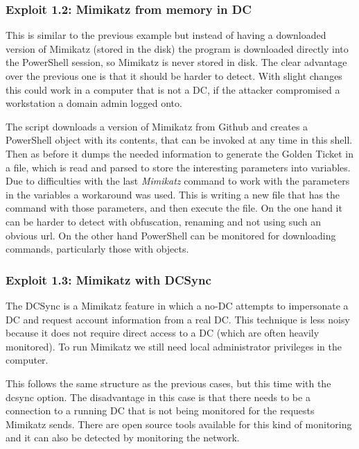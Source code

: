 \subsubsection{Exploit 1.2: Mimikatz from memory in DC} \label{invoke-Mimikatz}
This is similar to the previous example but instead of having a downloaded version of Mimikatz (stored in the disk) the program is downloaded directly into the PowerShell session, so Mimikatz is never stored in disk.
The clear advantage over the previous one is that it should be harder to detect.
\linej
With slight changes this could work in a computer that is not a DC, if the attacker compromised a workstation a domain admin logged onto\cite{dump_ways}.
\linej

\linej
The script downloads a version of Mimikatz from Github and creates a PowerShell object with its contents, that can be invoked at any time in this shell\cite{powersploit}\cite{mimikatz_details}. Then as before it dumps the needed information to generate the Golden Ticket in a file, which is read and parsed to store the interesting parameters into variables.
\linej
Due to difficulties with the last \textit{Mimikatz} command to work with the parameters in the variables a workaround was used. This is writing a new file that has the command with those parameters, and then execute the file.
\linej
\linej
On the one hand it can be harder to detect with obfuscation, renaming and not using such an obvious url.
On the other hand PowerShell can be monitored for downloading commands, particularly those with objects.

\subsubsection{Exploit 1.3: Mimikatz with DCSync}
The DCSync is a Mimikatz feature in which a no-DC attempts to impersonate a DC and request account information from a real DC. This technique is less noisy because it does not require direct access to a DC (which are often heavily monitored)\cite{dump_ways}\cite{pentestlab}. To run Mimikatz we still need local administrator privileges in the computer.
\linej

\linej
This follows the same structure as the previous cases, but this time with the dcsync option.
The disadvantage in this case is that there needs to be a connection to a running DC that is not being monitored for the requests Mimikatz sends. There are open source tools available for this kind of monitoring\cite{dcsync_monitor} and it can also be detected by monitoring the network\cite{dcsync_monitor_network}.

